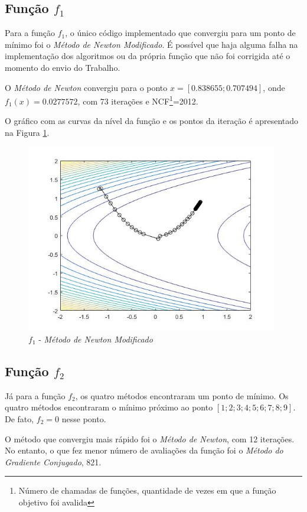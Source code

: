 \documentclass[10pt,a4paper]{article}
\begin{document}
	\subsection{Função $f_1$}

	Para a função $f_1$, o único código implementado que convergiu para um ponto de mínimo foi o \emph{Método de Newton Modificado}. É possível que haja alguma falha na implementação dos algoritmos ou da própria função que não foi corrigida até o momento do envio do Trabalho.

	O \emph{Método de Newton} convergiu para o ponto $x = [0.838655; 0.707494]$, onde $f_1(x) = 0.0277572$, com 73 iterações e NCF\footnote{Número de chamadas de funções, quantidade de vezes em que a função objetivo foi avalida}=2012.

	O gráfico com as curvas da nível da função e os pontos da iteração é apresentado na Figura \ref{fig_f1_newton}.

	\begin{figure}[h]
		\centering
		\includegraphics[width=11cm]{f1_newton}
		\caption{$f_1$ - \emph{Método de Newton Modificado}}
		\label{fig_f1_newton}
	\end{figure}

	\subsection{Função $f_2$}

	Já para a função $f_2$, os quatro métodos encontraram um ponto de mínimo. Os quatro métodos encontraram o mínimo próximo ao ponto $[1;2;3;4;5;6;7;8;9]$. De fato, $f_2 = 0$ nesse ponto.

	O método que convergiu mais rápido foi o \emph{Método de Newton}, com 12 iterações. No entanto, o que fez menor número de avaliações da função foi o \emph{Método do Gradiente Conjugado}, 821.
\end{document}
